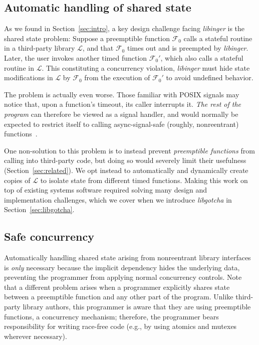 

\subsection{Automatic handling of shared state}

As we found in Section~\ref{sec:intro}, a key design challenge facing
\textit{libinger} is the shared state problem:  Suppose a preemptible function
$\mathcal{F}_0$ calls a stateful routine in a third-party library $\mathcal{L}$, and
that $\mathcal{F}_0$ times out and is preempted by \textit{libinger}.  Later, the
user invokes another timed function $\mathcal{F}_0'$, which also calls a stateful
routine in $\mathcal{L}$.  This constituting a concurrency violation,
\textit{libinger} must hide state modifications in $\mathcal{L}$ by $\mathcal{F}_0$
from the execution of $\mathcal{F}_0'$ to avoid undefined behavior.

The problem is actually even worse.  Those familiar with POSIX signals may notice
that, upon a function's timeout, its caller interrupts it.  \textit{The rest of the
program} can therefore be viewed as a signal handler, and would normally be expected
to restrict itself to calling async-signal-safe (roughly, nonreentrant)
functions~\cite{signal-safety-manpage}.

One non-solution to this problem is to instead prevent \textit{preemptible functions}
from
calling into third-party code, but doing so would
severely limit their usefulness (Section~\ref{sec:related}).  We opt instead
to automatically and dynamically create copies of $\mathcal{L}$ to
isolate state from different timed functions.  Making this work on top of
existing systems software required solving many
design and implementation challenges, which we cover when we introduce
\textit{libgotcha} in Section~\ref{sec:libgotcha}.


\subsection{Safe concurrency}

Automatically handling shared state arising from nonreentrant library interfaces is
\textit{only} necessary because the implicit dependency hides the underlying data,
preventing the programmer from applying normal concurrency controls.  Note that a
different problem arises when a programmer explicitly shares state between a
preemptible function and any other part of the program.  Unlike third-party library
authors, this programmer is aware that they are using preemptible functions, a
concurrency mechanism; therefore, the programmer bears responsibility for writing
race-free code (e.g., by using atomics and mutexes wherever necessary).

